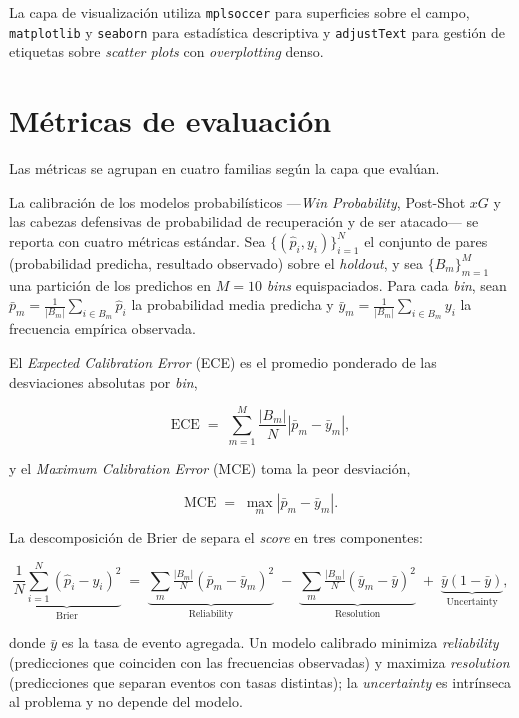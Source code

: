 La capa de visualización utiliza \texttt{mplsoccer} para superficies
sobre el campo, \texttt{matplotlib} y \texttt{seaborn} para
estadística descriptiva y \texttt{adjustText} para gestión de
etiquetas sobre \textit{scatter plots} con \textit{overplotting}
denso.


\section{Métricas de evaluación}
\label{sec:metricas-evaluacion}

Las métricas se agrupan en cuatro familias según la capa que evalúan.

La calibración de los modelos probabilísticos ---\textit{Win
Probability}, Post-Shot $xG$ y las cabezas defensivas de probabilidad
de recuperación y de ser atacado--- se reporta con cuatro métricas
estándar. Sea $\{(\hat{p}_i, y_i)\}_{i=1}^N$ el conjunto de pares
(probabilidad predicha, resultado observado) sobre el \textit{holdout},
y sea $\{B_m\}_{m=1}^M$ una partición de los predichos en $M = 10$
\textit{bins} equispaciados. Para cada \textit{bin}, sean
$\bar{p}_m = \frac{1}{|B_m|}\sum_{i \in B_m} \hat{p}_i$ la
probabilidad media predicha y
$\bar{y}_m = \frac{1}{|B_m|}\sum_{i \in B_m} y_i$ la frecuencia
empírica observada.

El \textit{Expected Calibration Error} (ECE) es el promedio ponderado
de las desviaciones absolutas por \textit{bin},

\[
\text{ECE} \;=\; \sum_{m=1}^M \frac{|B_m|}{N} \left| \bar{p}_m - \bar{y}_m \right|,
\]

y el \textit{Maximum Calibration Error} (MCE) toma la peor desviación,

\[
\text{MCE} \;=\; \max_{m} \left| \bar{p}_m - \bar{y}_m \right|.
\]

La descomposición de Brier de \textcite{Murphy1973Brier} separa el
\textit{score} en tres componentes:

\[
\underbrace{\frac{1}{N}\sum_{i=1}^N (\hat{p}_i - y_i)^2}_{\text{Brier}}
\;=\; \underbrace{\sum_{m} \tfrac{|B_m|}{N} (\bar{p}_m - \bar{y}_m)^2}_{\text{Reliability}}
\;-\; \underbrace{\sum_{m} \tfrac{|B_m|}{N} (\bar{y}_m - \bar{y})^2}_{\text{Resolution}}
\;+\; \underbrace{\bar{y}(1 - \bar{y})}_{\text{Uncertainty}},
\]

donde $\bar{y}$ es la tasa de evento agregada. Un modelo calibrado
minimiza \textit{reliability} (predicciones que coinciden con las
frecuencias observadas) y maximiza \textit{resolution} (predicciones
que separan eventos con tasas distintas); la \textit{uncertainty} es
intrínseca al problema y no depende del modelo.


